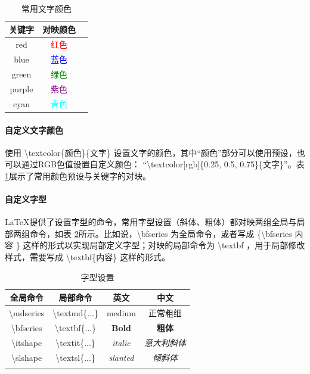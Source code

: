 \documentclass[AutoFakeBold]{ZafuThesis}
\begin{document}
\begin{table}[htbp]
    \centering
    \caption{常用文字颜色}
    \begin{tabular}{c c c}
      \toprule[1pt]
      关键字 & 对映颜色\\
      \hline
      red &  \textcolor{red}{红色} \\
      blue &  \textcolor{blue}{蓝色} \\
      green &  \textcolor{green}{绿色} \\
      purple &  \textcolor{purple}{紫色} \\
      cyan &  \textcolor{cyan}{青色} \\
      \toprule[1pt]
    \end{tabular}
    \label{table_常用文字颜色}
\end{table}\par

\paragraph{自定义文字颜色} 使用 \textbackslash textcolor\{颜色\}\{文字\} 设置文字的颜色，其中“颜色”部分可以使用预设，也可以通过RGB色值设置自定义颜色： “\textbackslash textcolor[rgb]\{0.25, 0.5, 0.75\}\{文字\}”。表 \ref{table_常用文字颜色}展示了常用颜色预设与关键字的对映。


\paragraph{自定义字型}
\LaTeX 提供了设置字型的命令，常用字型设置（斜体、粗体）都对映两组全局与局部两组命令，如表 \ref{table_字型设置}所示。比如说，\textbackslash bfseries 为全局命令，或者写成 \{\textbackslash bfseries 内容 \} 这样的形式以实现局部定义字型；对映的局部命令为 \textbackslash textbf ，用于局部修改样式，需要写成 \textbackslash textbf\{内容\} 这样的形式。
\begin{table}[htbp]
  \centering
  \caption{字型设置}
  \begin{tabular}{c c c c}
    \toprule[1pt]
    全局命令 & 局部命令 & 英文 & 中文 \\
    \hline
    \textbackslash mdseries  & \textbackslash textmd\{...\} & \textmd{medium}& \textmd{正常粗细} \\
    \textbackslash bfseries  & \textbackslash textbf\{...\} & \textbf{Bold}& \textbf{粗体} \\
    \textbackslash itshape  & \textbackslash textit\{...\} & \textit{italic}& \textit{意大利斜体} \\
    \textbackslash slshape  & \textbackslash textsl\{...\} & \textsl{slanted}& \textsl{倾斜体} \\
    \toprule[1pt]
    \label{table_字型设置}
  \end{tabular}
\end{table}
\end{document}
